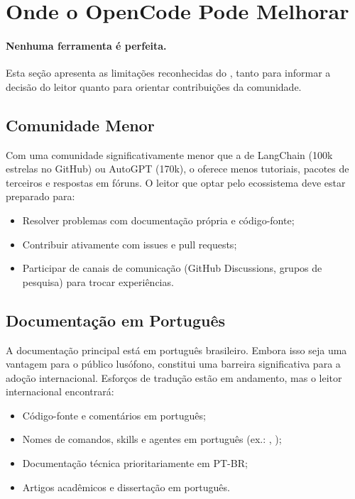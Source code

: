 \section{Onde o OpenCode Pode Melhorar}
\label{sec:melhorar}
\nivelavancado

\paragraph{Nenhuma ferramenta é perfeita.} Esta seção apresenta as
limitações reconhecidas do \opencodeeco{}, tanto para informar a
decisão do leitor quanto para orientar contribuições da comunidade.

\subsection{Comunidade Menor}

Com uma comunidade significativamente menor que a de LangChain (100k
estrelas no GitHub) ou AutoGPT (170k), o \opencodeeco{} oferece menos
tutoriais, pacotes de terceiros e respostas em fóruns. O leitor que
optar pelo ecossistema deve estar preparado para:
\begin{itemize}
    \item Resolver problemas com documentação própria e código-fonte;
    \item Contribuir ativamente com issues e pull requests;
    \item Participar de canais de comunicação (GitHub Discussions,
          grupos de pesquisa) para trocar experiências.
\end{itemize}

\subsection{Documentação em Português}

A documentação principal está em português brasileiro. Embora isso seja
uma vantagem para o público lusófono, constitui uma barreira
significativa para a adoção internacional. Esforços de tradução estão
em andamento, mas o leitor internacional encontrará:
\begin{itemize}
    \item Código-fonte e comentários em português;
    \item Nomes de comandos, skills e agentes em português
          (ex.: , );
    \item Documentação técnica prioritariamente em PT-BR;
    \item Artigos acadêmicos e dissertação em português.
\end{itemize}

